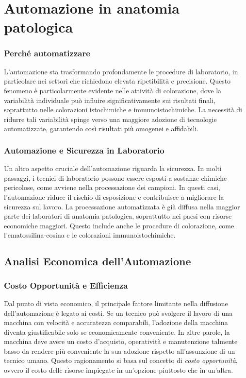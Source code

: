 \chapter{Automazione in anatomia patologica}


\subsection{Perché automatizzare}

L'automazione sta trasformando profondamente le procedure di laboratorio, in particolare nei settori che richiedono elevata ripetibilità e precisione. Questo fenomeno è particolarmente evidente nelle attività di colorazione, dove la variabilità individuale può influire significativamente sui risultati finali, soprattutto nelle colorazioni istochimiche e immunoistochimiche. La necessità di ridurre tali variabilità spinge verso una maggiore adozione di tecnologie automatizzate, garantendo così risultati più omogenei e affidabili.

\subsection{Automazione e Sicurezza in Laboratorio}

Un altro aspetto cruciale dell'automazione riguarda la sicurezza. In molti passaggi, i tecnici di laboratorio possono essere esposti a sostanze chimiche pericolose, come avviene nella processazione dei campioni. In questi casi, l'automazione riduce il rischio di esposizione e contribuisce a migliorare la sicurezza sul lavoro. La processazione automatizzata è già diffusa nella maggior parte dei laboratori di anatomia patologica, soprattutto nei paesi con risorse economiche maggiori. Questo include anche le procedure di colorazione, come l'ematossilina-eosina e le colorazioni immunoistochimiche.

\section{Analisi Economica dell'Automazione}

\subsection{Costo Opportunità e Efficienza}

Dal punto di vista economico, il principale fattore limitante nella diffusione dell'automazione è legato ai costi. Se un tecnico può svolgere il lavoro di una macchina con velocità e accuratezza comparabili, l'adozione della macchina diventa giustificabile solo se economicamente conveniente. In altre parole, la macchina deve avere un costo d'acquisto, operatività e manutenzione talmente basso da rendere più conveniente la sua adozione rispetto all'assunzione di un tecnico umano. Questo ragionamento si basa sul concetto di \textit{costo opportunità}, ovvero il costo delle risorse impiegate in un'opzione piuttosto che in un'altra.


